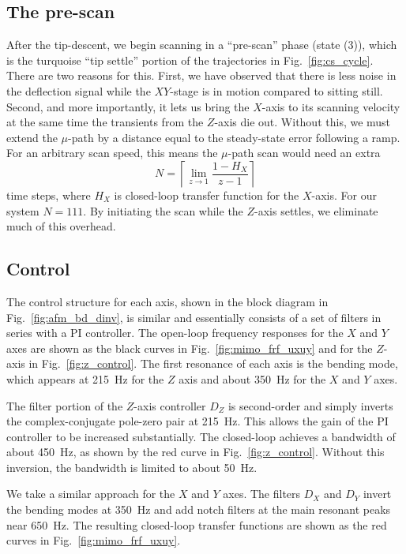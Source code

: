 \documentclass[journal]{IEEEtran}
\begin{document}
\subsection{The pre-scan}
After the tip-descent, we begin scanning in a ``pre-scan'' phase
(state (3)), which is the turquoise ``tip settle'' portion of the trajectories in
Fig.~\ref{fig:cs_cycle}. There are two reasons for this. First, we
have observed that there is less noise in the deflection signal while
the $XY$-stage is in motion compared to sitting still. Second, and more
importantly, it lets us bring the $X$-axis to its scanning velocity at
the same time the transients from the $Z$-axis die out. Without this,
we must extend the $\mu$-path by a distance equal to the steady-state
error following a ramp. For an arbitrary scan speed, this means the
$\mu$-path scan would need an extra
\begin{equation}
  N = \left\lceil\lim_{z\rightarrow 1} \frac{1-H_X}{z-1}\right\rceil
\end{equation}
time steps, where $H_X$ is closed-loop transfer function for the
$X$-axis. For our system $N=111$. By initiating the scan while the
$Z$-axis settles, we eliminate much of this overhead.

\subsection{Control}\label{sec:control}
The control structure for each axis, shown in the block diagram in
Fig.~\ref{fig:afm_bd_dinv}, is similar and essentially consists of a
set of filters in series with a PI controller. The open-loop frequency
responses for the $X$ and $Y$ axes are shown as the black curves in
Fig.~\ref{fig:mimo_frf_uxuy} and for the $Z$-axis in
Fig.~\ref{fig:z_control}. The first resonance of each axis is the
bending mode, which appears at 215~Hz for the $Z$ axis and about
350~Hz for the $X$ and $Y$ axes.

The filter portion of the $Z$-axis controller $D_Z$ is second-order
and simply inverts the complex-conjugate pole-zero pair at 215~Hz.
This allows the gain of the PI controller to be increased
substantially. The closed-loop achieves a bandwidth of about 450~Hz,
as shown by the red curve in Fig.~\ref{fig:z_control}. Without this
inversion, the bandwidth is limited to about 50~Hz.

We take a similar approach for the $X$ and $Y$ axes. The filters $D_X$
and $D_Y$ invert the bending modes at 350~Hz and add notch filters at
the main resonant peaks near 650~Hz. The resulting closed-loop
transfer functions are shown as the red curves in
Fig.~\ref{fig:mimo_frf_uxuy}.
\end{document}
